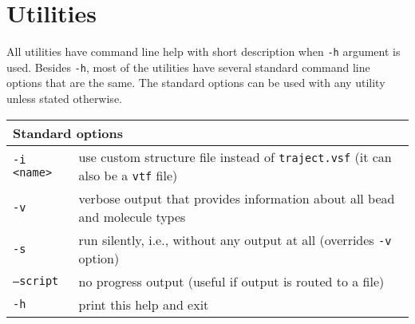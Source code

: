 \chapter{Utilities} \label{chap:Utils}

All utilities have command line help with short description when
\texttt{-h} argument is used. Besides \texttt{-h}, most of the utilities
have several standard command line options that are the same. The standard
options can be used with any utility unless stated otherwise.

\vspace{1em}
\noindent
\begin{tabular}{p{}p{}}
  \toprule
  \multicolumn{2}{l}{Standard options} \\
  \midrule
  \texttt{-i <name>} & use custom structure file instead of
    \texttt{traject.vsf} (it can also be a \texttt{vtf} file) \\
  \texttt{-v}        & verbose output that provides information about all
    bead and molecule types \\
  \texttt{-s}        & run silently, i.e., without any output at all
    (overrides \texttt{-v} option) \\
  \texttt{--script}  & no progress output (useful if output is routed to a
    file) \\
  \texttt{-h}        & print this help and exit \\
  \bottomrule
\end{tabular}



























